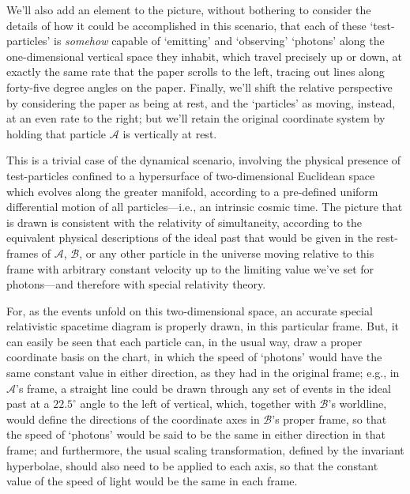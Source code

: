 We'll also add an element to the picture, without bothering to consider the details of how it could be accomplished in this scenario, that each of these `test-particles' is \textit{somehow} capable of `emitting' and `observing' `photons' along the one-dimensional vertical space they inhabit, which travel precisely up or down, at exactly the same rate that the paper scrolls to the left, tracing out lines along forty-five degree angles on the paper. Finally, we'll shift the relative perspective by considering the paper as being at rest, and the `particles' as moving, instead, at an even rate to the right; but we'll retain the original coordinate system by holding that particle $\mathcal{A}$ is vertically at rest.

This is a trivial case of the dynamical scenario, involving the physical presence of test-particles confined to a hypersurface of two-dimensional Euclidean space which evolves along the greater manifold, according to a pre-defined uniform differential motion of all particles---i.e., an intrinsic cosmic time. The picture that is drawn is consistent with the relativity of simultaneity, according to the equivalent physical descriptions of the ideal past that would be given in the rest-frames of $\mathcal{A}$, $\mathcal{B}$, or any other particle in the universe moving relative to this frame with arbitrary constant velocity up to the limiting value we've set for photons---and therefore with special relativity theory.

For, as the events unfold on this two-dimensional space, an accurate special relativistic spacetime diagram is properly drawn, in this particular frame. But, it can easily be seen that each particle can, in the usual way, draw a proper coordinate basis on the chart, in which the speed of `photons' would have the same constant value in either direction, as they had in the original frame; e.g., in $\mathcal{A}$'s frame, a straight line could be drawn through any set of events in the ideal past at a $22.5^{\circ}$ angle to the left of vertical, which, together with $\mathcal{B}$'s worldline, would define the directions of the coordinate axes in $\mathcal{B}$'s proper frame, so that the speed of `photons' would be said to be the same in either direction in that frame; and furthermore, the usual scaling transformation, defined by the invariant hyperbolae, should also need to be applied to each axis, so that the constant value of the speed of light would be the same in each frame.

